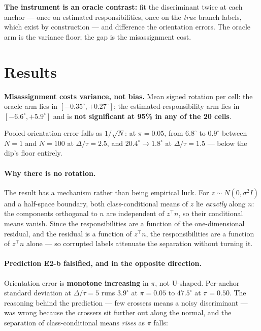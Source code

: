 \documentclass[11pt]{article}
\begin{document}
\textbf{The instrument is an oracle contrast:} fit the discriminant twice at each anchor --- once
on estimated responsibilities, once on the \emph{true} branch labels, which exist by construction
--- and difference the orientation errors. The oracle arm is the variance floor; the gap is the
misassignment cost.

\section{Results}

\begin{resultbox}
\noindent\textbf{Misassignment costs variance, not bias.} Mean signed rotation per cell: the
oracle arm lies in $[-0.35^\circ, +0.27^\circ]$; the estimated-responsibility arm lies in
$[-6.6^\circ, +5.9^\circ]$ and is \textbf{not significant at 95\% in any of the 20 cells}.

\smallskip
\noindent Pooled orientation error falls as $1/\sqrt{N}$: at $\pi = 0.05$, from $6.8^\circ$ to
$0.9^\circ$ between $N = 1$ and $N = 100$ at $\Delta/\tau = 2.5$, and $20.4^\circ \to 1.8^\circ$
at $\Delta/\tau = 1.5$ --- below the dip's floor entirely.
\end{resultbox}

\paragraph{Why there is no rotation.} The result has a mechanism rather than being empirical
luck. For $z \sim N(0,\sigma^2 I)$ and a half-space boundary, both class-conditional means of $z$
lie \emph{exactly} along $n$: the components orthogonal to $n$ are independent of $z^\top n$, so
their conditional means vanish. Since the responsibilities are a function of the
one-dimensional residual, and the residual is a function of $z^\top n$, the responsibilities are
a function of $z^\top n$ alone --- so corrupted labels attenuate the separation without turning
it.

\paragraph{Prediction E2-b falsified, and in the opposite direction.} Orientation error is
\textbf{monotone increasing} in $\pi$, not U-shaped. Per-anchor standard deviation at
$\Delta/\tau = 5$ runs $3.9^\circ$ at $\pi = 0.05$ to $47.5^\circ$ at $\pi = 0.50$. The reasoning
behind the prediction --- few crossers means a noisy discriminant --- was wrong because the
crossers sit further out along the normal, and the separation of class-conditional means
\emph{rises} as $\pi$ falls:
\end{document}
